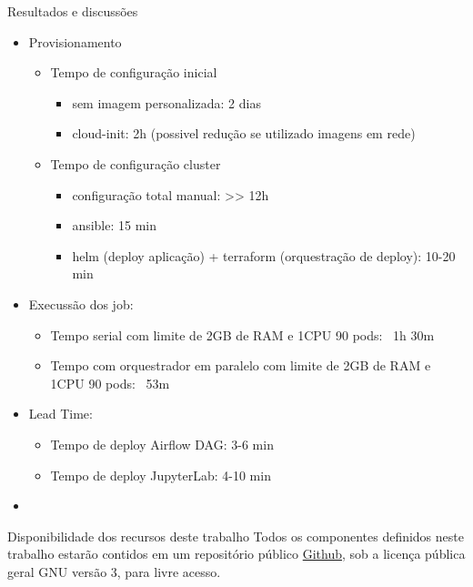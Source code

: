 \documentclass[10pt,brazil]{beamer}
\theoremstyle{definition}
\begin{document}
\begin{frame}{Resultados e discussões}
  \begin{itemize}
    \item Provisionamento
    \begin{itemize}
      \item Tempo de configuração inicial
      \begin{itemize}
        \item sem imagem personalizada: 2 dias
        \item cloud-init: 2h (possivel redução  se utilizado imagens em rede)
      \end{itemize}
    \end{itemize}
    \begin{itemize}
      \item Tempo de configuração cluster
        \begin{itemize}
          \item configuração total manual: >> 12h
          \item ansible: 15 min
          \item helm (deploy aplicação) + terraform (orquestração de deploy): 10-20 min
        \end{itemize}
    \end{itemize}
    \item Execussão dos job:
    \begin{itemize}
        \item Tempo serial com limite de 2GB de RAM e 1CPU 90 pods: ~1h 30m
        \item Tempo com orquestrador em paralelo com limite de 2GB de RAM e 1CPU 90 pods: ~53m
    \end{itemize}
    \item Lead Time:
    \begin{itemize}
        \item Tempo de deploy Airflow DAG: 3-6 min
        \item Tempo de deploy JupyterLab: 4-10 min
    \end{itemize}
    \item 
  \end{itemize}
  
  
\end{frame}

\begin{frame}{Disponibilidade dos recursos deste trabalho}
  Todos os componentes definidos neste trabalho estarão contidos em um repositório público \href{https://github.com/felipefrocha/esufmg-tcc}{Github}, sob a licença pública geral GNU versão 3, para livre acesso.
\end{frame}
\end{document}
